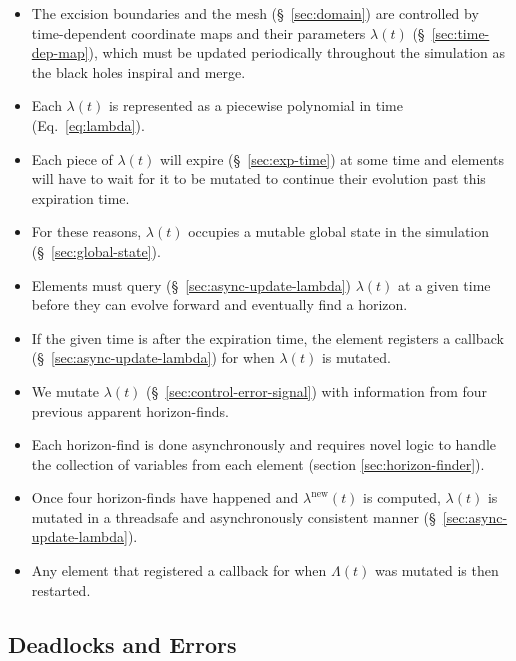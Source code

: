 \begin{bibunit}[unsrtnat]
\begin{itemize}
  \item The excision boundaries and the mesh (\S~\ref{sec:domain}) are
  controlled by time-dependent coordinate maps and their parameters $\lambda(t)$
  (\S~\ref{sec:time-dep-map}), which must be updated periodically
  throughout the simulation as the black holes inspiral and merge.
  \item Each $\lambda(t)$ is represented as a piecewise polynomial
  in time (Eq.~\eqref{eq:lambda}).
  \item Each piece of $\lambda(t)$ will expire (\S~\ref{sec:exp-time}) at
  some time and elements will have to wait for it to be mutated to continue
  their evolution past this expiration time.
  \item For these reasons, $\lambda(t)$ occupies a mutable global state in the
  simulation (\S~\ref{sec:global-state}).
  \item Elements must query (\S~\ref{sec:async-update-lambda}) $\lambda(t)$
  at a given time before they can evolve forward and eventually find a horizon.
  \item If the given time is after the expiration time, the element registers a
  callback (\S~\ref{sec:async-update-lambda}) for when $\lambda(t)$ is
  mutated.
  \item We mutate $\lambda(t)$ (\S~\ref{sec:control-error-signal}) with
  information from four previous apparent horizon-finds.
  \item Each horizon-find is done asynchronously and requires novel logic to
  handle the collection of variables from each element (section
  \ref{sec:horizon-finder}).
  \item Once four horizon-finds have happened and $\lambda^\mathrm{new}(t)$ is
  computed, $\lambda(t)$ is mutated in a threadsafe and asynchronously
  consistent manner (\S~\ref{sec:async-update-lambda}).
  \item Any element that registered a callback for when $\Lambda(t)$ was mutated
  is then restarted.
\end{itemize}

\subsection{Deadlocks and Errors\label{sec:deadlock}}


\end{bibunit}

